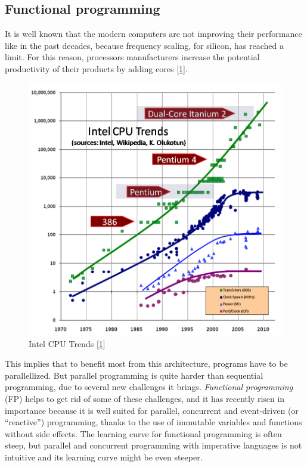 \documentclass[12pt,a4paper,oneside,openright]{book}
\begin{document}
\subsection{Functional programming}\label{functional-programming}

It is well known that the modern computers are not improving their
performance like in the past decades, because frequency scaling, for
silicon, has reached a limit. For this reason, processors manufacturers
increase the potential productivity of their products by adding cores
{[}\hyperref[ref-TurnConcurrency2015]{1}{]}.

\begin{figure}[htbp]
\centering
\includegraphics{figures/cpu.png}
\caption{Intel CPU Trends {[}\hyperref[ref-TurnConcurrency2015]{1}{]}
\label{cpu-freq}}
\end{figure}

This implies that to benefit most from this architecture, programs have
to be parallellized. But parallel programming is quite harder than
sequential programming, due to several new challenges it brings.
\emph{Functional programming} (FP) helps to get rid of some of these
challenges, and it has recently risen in importance because it is well
suited for parallel, concurrent and event-driven (or ``reactive'')
programming, thanks to the use of immutable variables and functions
without side effects. The learning curve for functional programming is
often steep, but parallel and concurrent programming with imperative
languages is not intuitive and its learning curve might be even steeper.
\end{document}
